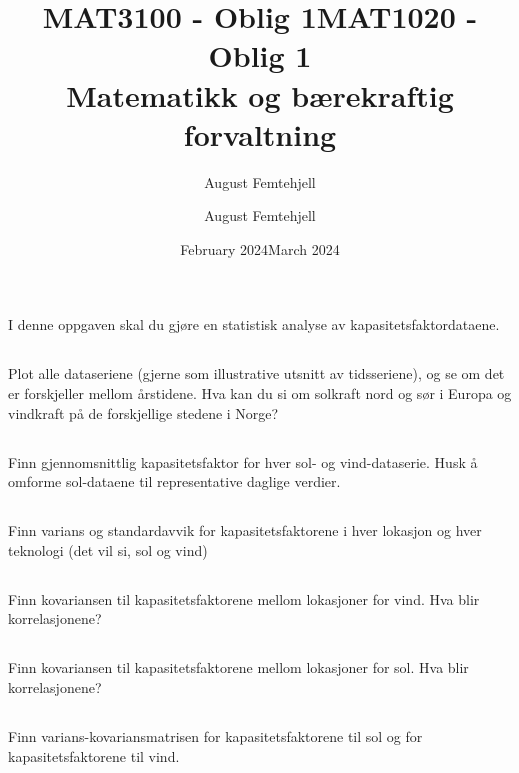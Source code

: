 \documentclass{article}
\title{MAT3100 - Oblig 1}
\author{August Femtehjell}
\date{February 2024}
\title{MAT1020 - Oblig 1\\Matematikk og bærekraftig forvaltning}
\author{August Femtehjell}
\date{March 2024}
\begin{document}
\maketitle

\section{}
I denne oppgaven skal du gjøre en statistisk analyse av kapasitetsfaktordataene.

\subsection{}
Plot alle dataseriene (gjerne som illustrative utsnitt av tidsseriene), og se om det er forskjeller mellom årstidene. Hva kan du si om solkraft nord og sør i Europa og vindkraft på de forskjellige stedene i Norge?

\subsection{}
Finn gjennomsnittlig kapasitetsfaktor for hver sol- og vind-dataserie. Husk å omforme sol-dataene til representative daglige verdier.

\subsection{}
Finn varians og standardavvik for kapasitetsfaktorene i hver lokasjon og hver teknologi (det vil si, sol og vind)

\subsection{}
Finn kovariansen til kapasitetsfaktorene mellom lokasjoner for vind. Hva blir korrelasjonene?

\subsection{}
Finn kovariansen til kapasitetsfaktorene mellom lokasjoner for sol. Hva blir korrelasjonene?

\subsection{}
Finn varians-kovariansmatrisen for kapasitetsfaktorene til sol og for kapasitetsfaktorene til vind.
\end{document}
